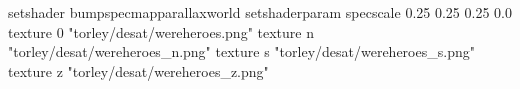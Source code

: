 setshader bumpspecmapparallaxworld
setshaderparam specscale 0.25 0.25 0.25 0.0
texture 0 "torley/desat/wereheroes.png"
texture n "torley/desat/wereheroes_n.png"
texture s "torley/desat/wereheroes_s.png"
texture z "torley/desat/wereheroes_z.png"

